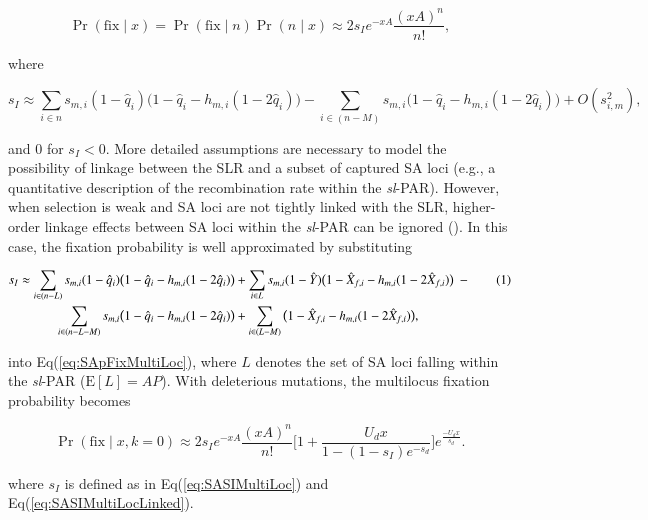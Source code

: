 \documentclass{article}[12pt]
\newcommand\numberthis{\addtocounter{equation}{1}\tag{\theequation}}
\begin{document}
\begin{equation}\label{eq:SApFixMultiLoc}
	\Pr(\text{fix} \mid x) = \Pr(\text{fix} \mid n) \Pr(n \mid x) \approx 2 s_I e^{-x A} \frac{(xA)^n}{n!},
\end{equation}

\noindent where

\begin{equation}\label{eq:SASIMultiLoc}
	s_I \approx \sum_{i \in n} s_{m,i} (1 - \hat{q}_{i}) \big( 1 - \hat{q}_i - h_{m,i} (1 - 2 \hat{q}_i) \big) - \sum_{i \in (n-M)} s_{m,i} \big( 1 - \hat{q}_i - h_{m,i} (1 - 2 \hat{q}_i) \big) + O(s_{i,m}^2),
\end{equation}

\noindent and $0$ for $s_I < 0$. More detailed assumptions are necessary to model the possibility of linkage between the SLR and a subset of captured SA loci (e.g., a quantitative description of the recombination rate within the {\itshape sl}-PAR). However, when selection is weak and SA loci are not tightly linked with the SLR, higher-order linkage effects between SA loci within the {\itshape sl}-PAR can be ignored (\citealt{Otto2019}). In this case, the fixation probability is well approximated by substituting 

\begin{align*}\label{eq:SASIMultiLocLinked}
		s_I \approx \sum_{i \in (n - L)} s_{m,i} (1 - \hat{q}_{i}) \big( 1 - \hat{q}_i - h_{m,i} (1 - 2 \hat{q}_i) \big) &+ \sum_{i \in L} s_{m,i}(1 - \hat{Y}) \big( 1 - \hat{X}_{f,i} - h_{m,i}(1 - 2 \hat{X}_{f,i}) \big)~- \numberthis\\
		\sum_{i \in (n-L-M)} s_{m,i} \big( 1 - \hat{q}_i - h_{m,i} (1 - 2 \hat{q}_i) \big) &+ \sum_{i \in (L-M)} \big( 1 - \hat{X}_{f,i} - h_{m,i}(1 - 2 \hat{X}_{f,i}) \big),
\end{align*}

\noindent into Eq(\ref{eq:SApFixMultiLoc}), where $L$ denotes the set of SA loci falling within the {\itshape sl}-PAR ($\text{E} [L] = AP$). With deleterious mutations, the multilocus fixation probability becomes

\begin{equation} \label{eq:SApFixMultiLocDelMut}
	\Pr(\text{fix} \mid x, k = 0) \approx 2 s_I e^{-xA} \frac{(xA)^n}{n!} \Bigg[ 1+ \frac{U_d x}{1 - (1-s_I)e^{-s_d}} \Bigg] e^{\frac{-					U_d x}{s_d}}.
\end{equation}

\noindent where $s_I$ is defined as in Eq(\ref{eq:SASIMultiLoc}) and Eq(\ref{eq:SASIMultiLocLinked}).
\vspace{12pt}
\end{document}
